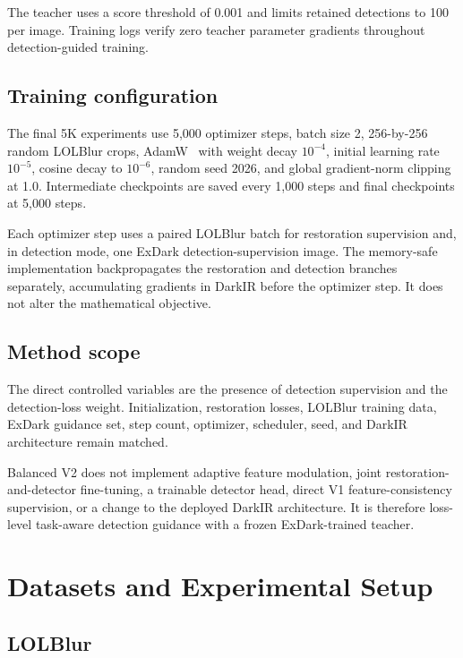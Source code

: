 The teacher uses a score threshold of 0.001 and limits retained detections
to 100 per image. Training logs verify zero teacher parameter gradients
throughout detection-guided training.

\subsection{Training configuration}

The final 5K experiments use 5,000 optimizer steps, batch size 2,
256-by-256 random LOLBlur crops, AdamW~\cite{loshchilov2019adamw} with weight decay \(10^{-4}\),
initial learning rate \(10^{-5}\), cosine decay to \(10^{-6}\), random seed
2026, and global gradient-norm clipping at 1.0. Intermediate checkpoints
are saved every 1,000 steps and final checkpoints at 5,000 steps.

Each optimizer step uses a paired LOLBlur batch for restoration
supervision and, in detection mode, one ExDark detection-supervision image.
The memory-safe implementation backpropagates the restoration and
detection branches separately, accumulating gradients in DarkIR before the
optimizer step. It does not alter the mathematical objective.

\subsection{Method scope}

The direct controlled variables are the presence of detection supervision
and the detection-loss weight. Initialization, restoration losses,
LOLBlur training data, ExDark guidance set, step count, optimizer,
scheduler, seed, and DarkIR architecture remain matched.

Balanced V2 does not implement adaptive feature modulation, joint
restoration-and-detector fine-tuning, a trainable detector head, direct
V1 feature-consistency supervision, or a change to the deployed DarkIR
architecture. It is therefore loss-level task-aware detection guidance
with a frozen ExDark-trained teacher.

\section{Datasets and Experimental Setup}
\label{sec:datasets}

\subsection{LOLBlur}

